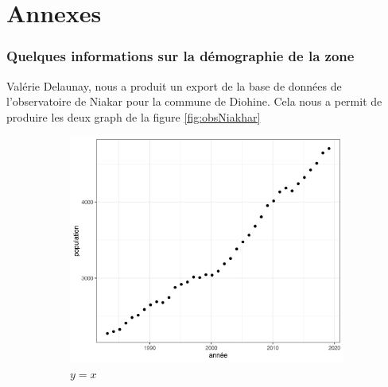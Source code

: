 \part*{Annexes}

\section{Quelques informations sur la démographie de la zone}

Valérie Delaunay, nous a produit un export de la base de données de l'observatoire de Niakar pour la commune de Diohine. Cela nous a permit de produire les deux graph de la figure \ref{fig:obsNiakhar}

\begin{figure}
     \centering
     \begin{subfigure}[b]{0.45\textwidth}
         \centering
         \includegraphics[width=\textwidth]{img/population1995-2020_diohine.png}
         \caption{$y=x$}
         \label{fig:pop}
     \end{subfigure}
     \hfill
     \begin{subfigure}[b]{0.45\textwidth}
         \centering

\end{subfigure}
\end{figure}
